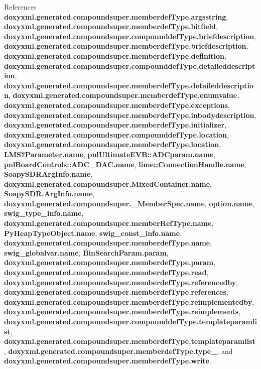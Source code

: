 References {\bf doxyxml.\+generated.\+compoundsuper.\+memberdef\+Type.\+argsstring}, {\bf doxyxml.\+generated.\+compoundsuper.\+memberdef\+Type.\+bitfield}, {\bf doxyxml.\+generated.\+compoundsuper.\+compounddef\+Type.\+briefdescription}, {\bf doxyxml.\+generated.\+compoundsuper.\+memberdef\+Type.\+briefdescription}, {\bf doxyxml.\+generated.\+compoundsuper.\+memberdef\+Type.\+definition}, {\bf doxyxml.\+generated.\+compoundsuper.\+compounddef\+Type.\+detaileddescription}, {\bf doxyxml.\+generated.\+compoundsuper.\+memberdef\+Type.\+detaileddescription}, {\bf doxyxml.\+generated.\+compoundsuper.\+memberdef\+Type.\+enumvalue}, {\bf doxyxml.\+generated.\+compoundsuper.\+memberdef\+Type.\+exceptions}, {\bf doxyxml.\+generated.\+compoundsuper.\+memberdef\+Type.\+inbodydescription}, {\bf doxyxml.\+generated.\+compoundsuper.\+memberdef\+Type.\+initializer}, {\bf doxyxml.\+generated.\+compoundsuper.\+compounddef\+Type.\+location}, {\bf doxyxml.\+generated.\+compoundsuper.\+memberdef\+Type.\+location}, {\bf L\+M\+S7\+Parameter.\+name}, {\bf pnl\+Ultimate\+E\+V\+B\+::\+A\+D\+Cparam.\+name}, {\bf pnl\+Board\+Controls\+::\+A\+D\+C\+\_\+\+D\+A\+C.\+name}, {\bf lime\+::\+Connection\+Handle.\+name}, {\bf Soapy\+S\+D\+R\+Arg\+Info.\+name}, {\bf doxyxml.\+generated.\+compoundsuper.\+Mixed\+Container.\+name}, {\bf Soapy\+S\+D\+R.\+Arg\+Info.\+name}, {\bf doxyxml.\+generated.\+compoundsuper.\+\_\+\+Member\+Spec.\+name}, {\bf option.\+name}, {\bf swig\+\_\+type\+\_\+info.\+name}, {\bf doxyxml.\+generated.\+compoundsuper.\+member\+Ref\+Type.\+name}, {\bf Py\+Heap\+Type\+Object.\+name}, {\bf swig\+\_\+const\+\_\+info.\+name}, {\bf doxyxml.\+generated.\+compoundsuper.\+memberdef\+Type.\+name}, {\bf swig\+\_\+globalvar.\+name}, {\bf Bin\+Search\+Param.\+param}, {\bf doxyxml.\+generated.\+compoundsuper.\+memberdef\+Type.\+param}, {\bf doxyxml.\+generated.\+compoundsuper.\+memberdef\+Type.\+read}, {\bf doxyxml.\+generated.\+compoundsuper.\+memberdef\+Type.\+referencedby}, {\bf doxyxml.\+generated.\+compoundsuper.\+memberdef\+Type.\+references}, {\bf doxyxml.\+generated.\+compoundsuper.\+memberdef\+Type.\+reimplementedby}, {\bf doxyxml.\+generated.\+compoundsuper.\+memberdef\+Type.\+reimplements}, {\bf doxyxml.\+generated.\+compoundsuper.\+compounddef\+Type.\+templateparamlist}, {\bf doxyxml.\+generated.\+compoundsuper.\+memberdef\+Type.\+templateparamlist}, {\bf doxyxml.\+generated.\+compoundsuper.\+memberdef\+Type.\+type\+\_\+}, and {\bf doxyxml.\+generated.\+compoundsuper.\+memberdef\+Type.\+write}.



